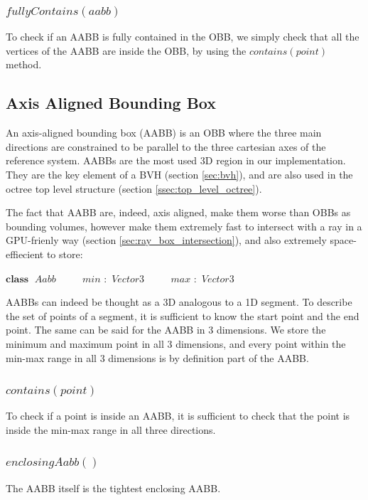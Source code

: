 \documentclass{PoliMi_MasterThesis}
\newcommand*\Class[1]{\State $\textbf{class} \;$ #1}
\newcommand*\Member[2]{\State $\qquad$ #1 $:$ #2}
\begin{document}
\subsubsection*{$fullyContains(aabb)$}
To check if an AABB is fully contained in the OBB, we simply check that all the vertices of the AABB are inside the OBB, by using the $contains(point)$ method.

\subsection{Axis Aligned Bounding Box} \label{ssec:aabb}
An axis-aligned bounding box (AABB) is an OBB where the three main directions are constrained to be parallel to the three cartesian axes of the reference system. AABBs are the most used 3D region in our implementation. They are the key element of a BVH (section \ref{sec:bvh}), and are also used in the octree top level structure (section \ref{ssec:top_level_octree}).

The fact that AABB are, indeed, axis aligned, make them worse than OBBs as bounding volumes, however make them extremely fast to intersect with a ray in a GPU-frienly way (section \ref{sec:ray_box_intersection}), and also extremely space-effiecient to store:
\begin{algorithm}[H]
	\begin{algorithmic}
		\Class{$Aabb$}
		\Member{$min$}{$Vector3$}
		\Member{$max$}{$Vector3$}
	\end{algorithmic}
\end{algorithm} 

AABBs can indeed be thought as a 3D analogous to a 1D segment. To describe the set of points of a segment, it is sufficient to know the start point and the end point. The same can be said for the AABB in 3 dimensions. We store the minimum and maximum point in all 3 dimensions, and every point within the min-max range in all 3 dimensions is by definition part of the AABB.

\subsubsection*{$contains(point)$}
To check if a point is inside an AABB, it is sufficient to check that the point is inside the min-max range in all three directions.

\subsubsection*{$enclosingAabb()$}
The AABB itself is the tightest enclosing AABB.
\end{document}
